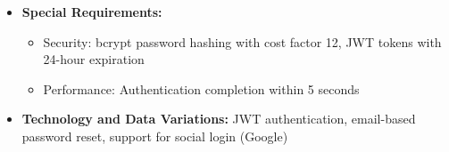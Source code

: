 \begin{itemize}
\begin{itemize}
        \item 3a. Login fails or account locked: System increments counter and requires password reset
        \item 4a. Email verification fails: System resends verification email
    \end{itemize}
    \item \textbf{Special Requirements:}
    \begin{itemize}
        \item Security: bcrypt password hashing with cost factor 12, JWT tokens with 24-hour expiration
        \item Performance: Authentication completion within 5 seconds
    \end{itemize}
    \item \textbf{Technology and Data Variations:} JWT authentication, email-based password reset, support for social login (Google)
\end{itemize}

